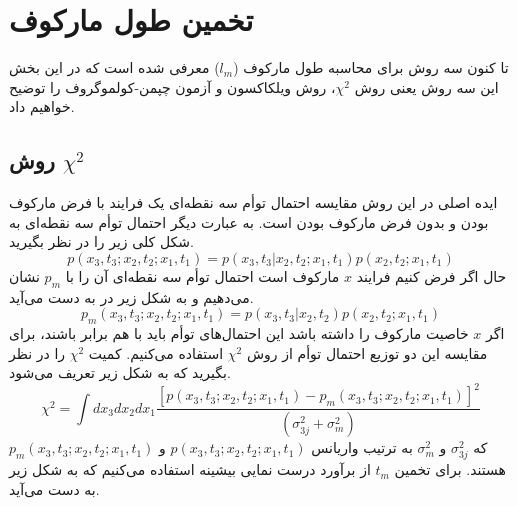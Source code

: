 \section{تخمین طول مارکوف}
تا کنون سه روش برای محاسبه طول مارکوف ($l_m$) معرفی شده است که در این بخش این سه روش یعنی روش 
$\chi^2$، روش ویلکاکسون و آزمون چپمن-کولموگروف را توضیح خواهیم داد.

\subsection{روش $\chi^2$}

ایده اصلی در این روش مقایسه احتمال توأم سه نقطه‌ای یک فرایند با فرض مارکوف بودن و بدون فرض مارکوف بودن است. به عبارت دیگر احتمال توأم سه نقطه‌ای به شکل کلی زیر را در نظر بگیرید.
\begin{equation}
  p\left(x_{3}, t_{3} ; x_{2}, t_{2} ; x_{1}, t_{1}\right) = p\left(x_{3}, t_{3} | x_{2}, t_{2} ; x_{1}, t_{1}\right) p\left(x_{2}, t_{2} ; x_{1}, t_{1}\right)
\end{equation}
حال اگر فرض کنیم فرایند $x$ مارکوف است احتمال توأم سه نقطه‌ای آن را با $p_m$ نشان می‌دهیم و به شکل زیر در به دست می‌آید.
\begin{equation}
  p_{m}\left(x_{3}, t_{3} ; x_{2}, t_{2} ; x_{1}, t_{1}\right) = p\left(x_{3}, t_{3} | x_{2}, t_{2} \right) p\left(x_{2}, t_{2} ; x_{1}, t_{1}\right)
\end{equation}
اگر $x$ خاصیت مارکوف را داشته باشد این احتمال‌های توأم باید با هم برابر باشند، برای مقایسه این دو توزیع احتمال توأم از روش $\chi^2$ استفاده می‌کنیم. کمیت $\chi ^2$ را در نظر بگیرید که به شکل زیر تعریف می‌شود.
\begin{equation}
  \chi^{2} = \int d x_{3} d x_{2} d x_{1} \frac{\left[p\left(x_{3}, t_{3} ; x_{2}, t_{2} ; x_{1}, t_{1}\right) - p_{m}\left(x_{3}, t_{3} ; x_{2}, t_{2} ; x_{1}, t_{1}\right)\right]^{2}}{\left(\sigma_{3 j}^{2}+\sigma_{m}^{2}\right)}
\end{equation}
که $\sigma_{3 j}^{2}$ و $\sigma_{m}^{2}$ به ترتیب واریانس $p\left(x_{3}, t_{3} ; x_{2}, t_{2} ; x_{1}, t_{1}\right)$ و $p_{m}\left(x_{3}, t_{3} ; x_{2}, t_{2} ; x_{1}, t_{1}\right)$ هستند. برای تخمین $t_m$ از برآورد درست نمایی بیشینه استفاده می‌کنیم که به شکل زیر به دست می‌آید.

